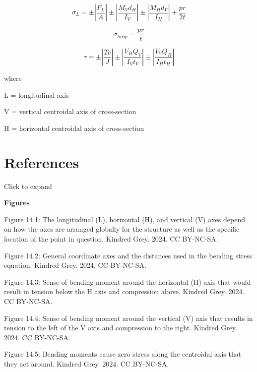 \documentclass[
  letterpaper,
  DIV=11,
  numbers=noendperiod]{scrreprt}
\theoremstyle{definition}
\theoremstyle{remark}
\begin{document}
\begin{tcolorbox}[enhanced jigsaw, leftrule=.75mm, bottomrule=.15mm, opacityback=0, opacitybacktitle=0.6, colframe=quarto-callout-note-color-frame, toprule=.15mm, colbacktitle=quarto-callout-note-color!10!white, coltitle=black, bottomtitle=1mm, title={Key equations}, titlerule=0mm, toptitle=1mm, colback=white, rightrule=.15mm, left=2mm, arc=.35mm, breakable]

\[
\sigma_L= \pm\left|\frac{F_L}{A}\right| \pm\left|\frac{M_V d_H}{I_V}\right| \pm\left|\frac{M_H d_V}{I_H}\right|+\frac{p r}{2 t}
\]

\[
\sigma_{hoop}=\frac{p r}{t}
\]

\[
\tau= \pm\left|\frac{T c}{J}\right| \pm\left|\frac{V_H Q_V}{I_V t_V}\right| \pm\left|\frac{V_V Q_H}{I_H t_H}\right|
\]

where

L = longitudinal axis

V = vertical centroidal axis of cross-section

H = horizontal centroidal axis of cross-section

\end{tcolorbox}

\section*{References}\label{references-13}


Click to expand

\textbf{Figures}

Figure 14.1: The longitudinal (L), horizontal (H), and vertical (V) axes
depend on how the axes are arranged globally for the structure as well
as the specific location of the point in question. Kindred Grey. 2024.
CC BY-NC-SA.

Figure 14.2: General coordinate axes and the distances used in the
bending stress equation. Kindred Grey. 2024. CC BY-NC-SA.

Figure 14.3: Sense of bending moment around the horizontal (H) axis that
would result in tension below the H axis and compression above. Kindred
Grey. 2024. CC BY-NC-SA.

Figure 14.4: Sense of bending moment around the vertical (V) axis that
results in tension to the left of the V axis and compression to the
right. Kindred Grey. 2024. CC BY-NC-SA.

Figure 14.5: Bending moments cause zero stress along the centroidal axis
that they act around. Kindred Grey. 2024. CC BY-NC-SA.
\end{document}
